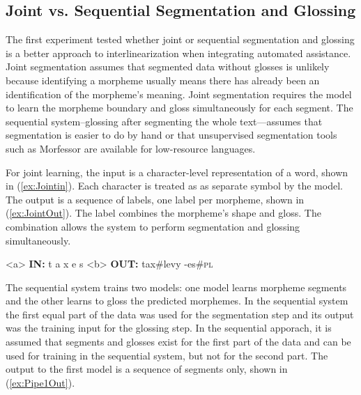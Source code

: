 

\subsection{Joint vs. Sequential Segmentation and Glossing}
\label{sec:sgjoint}

The first experiment tested whether joint or sequential segmentation and glossing is a better approach to interlinearization when integrating automated assistance. Joint segmentation assumes that segmented data without glosses is unlikely because identifying a morpheme usually means there has already been an identification of the morpheme's meaning.
Joint segmentation requires the model to learn the morpheme boundary and gloss simultaneously for each segment. The sequential system--glossing after segmenting the whole text---assumes that segmentation is easier to do by hand or that unsupervised segmentation tools such as Morfessor \citep{smit-etal-2014-morfessor} are available for low-resource languages. 

For joint learning, the input is a character-level representation of a word, shown in (\ref{ex:Jointin}). Each character is treated as as separate symbol by the model. The output is a sequence of labels, one label per morpheme, shown in (\ref{ex:JointOut}). The label combines the morpheme's shape and gloss. The combination allows the system to perform segmentation and glossing simultaneously. 

\pex   
\label{ex:JointInOut}
\a<a> \textbf{IN:} \hspace{6 mm} t \hspace{2 mm} a \hspace{2 mm} x \hspace{2 mm} e \hspace{2 mm} s 
\label{ex:Jointin}
\a<b> \textbf{OUT:} \hspace{2 mm} tax\#levy \hspace{3 mm} -es\#\textsc{pl} 
\label{ex:JointOut}
\xe

The sequential system trains two models: one model learns morpheme segments and the other learns to gloss the predicted morphemes. In the sequential system the first equal part of the data was used for the segmentation step and its output was the training input for the glossing step. In the sequential apporach, it is assumed that segments and glosses exist for the first part of the data and can be used for training in the sequential system, but not for the second part. The output to the first model is a sequence of segments only, shown in (\ref{ex:Pipe1Out}). 

